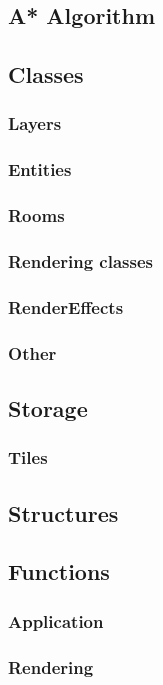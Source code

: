 \documentclass{article}
\begin{document}
        \subsection{A* Algorithm}
        \subsection{Classes}
            \subsubsection{Layers}
            \subsubsection{Entities}
            \subsubsection{Rooms}
            \subsubsection{Rendering classes}
            \subsubsection{RenderEffects}
            \subsubsection{Other}
        \subsection{Storage}
            \subsubsection{Tiles}
            \subsection{Structures}
        \subsection{Functions}
            \subsubsection{Application}
            \subsubsection{Rendering}
\end{document}
